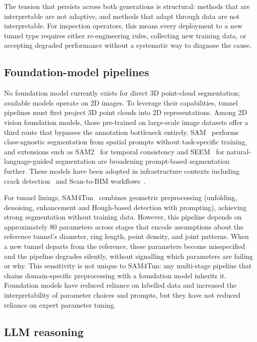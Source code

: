 \documentclass[a4paper,fleqn]{cas-dc}
\begin{document}
The tension that persists across both generations is structural: methods that are interpretable are not adaptive, and methods that adapt through data are not interpretable. For inspection operators, this means every deployment to a new tunnel type requires either re-engineering rules, collecting new training data, or accepting degraded performance without a systematic way to diagnose the cause.

\subsection{Foundation-model pipelines}

No foundation model currently exists for direct 3D point-cloud segmentation; available models operate on 2D images. To leverage their capabilities, tunnel pipelines must first project 3D point clouds into 2D representations. Among 2D vision foundation models, those pre-trained on large-scale image datasets offer a third route that bypasses the annotation bottleneck entirely. SAM~\cite{kirillov2023sam} performs class-agnostic segmentation from spatial prompts without task-specific training, and extensions such as SAM2~\cite{ravi2024sam2} for temporal consistency and SEEM~\cite{zou2023segment} for natural-language-guided segmentation are broadening prompt-based segmentation further. These models have been adopted in infrastructure contexts including crack detection~\cite{ravi2024cracksam} and Scan-to-BIM workflows~\cite{wang2024omni}.

For tunnel linings, SAM4Tun~\cite{ye2025sam4tun} combines geometric preprocessing (unfolding, denoising, enhancement and Hough-based detection with prompting), achieving strong segmentation without training data. However, this pipeline depends on approximately 80 parameters across stages that encode assumptions about the reference tunnel's diameter, ring length, point density, and joint patterns. When a new tunnel departs from the reference, these parameters become misspecified and the pipeline degrades silently, without signalling which parameters are failing or why. This sensitivity is not unique to SAM4Tun: any multi-stage pipeline that chains domain-specific preprocessing with a foundation model inherits it. Foundation models have reduced reliance on labelled data and increased the interpretability of parameter choices and prompts, but they have not reduced reliance on expert parameter tuning.

\subsection{LLM reasoning}
\end{document}
